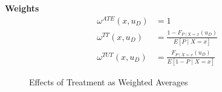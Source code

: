 \begin{frame}
	\textbf{Weights}
	\begin{align*}
		\omega^{ATE}(x, u_D) & = 1 \\
		\omega^{TT}(x, u_D) & = \frac{1 - F_{P\mid X=x}(u_D)}{E[P \mid X = x]}\\
		\omega^{TUT}(x, u_D) & = \frac{F_{P\mid X=x}(u_D)}{E[1 - P \mid X = x]}
	\end{align*}
\end{frame}
\begin{frame}
	\begin{figure}\caption{Effects of Treatment as Weighted Averages}
	\end{figure}
\end{frame}
